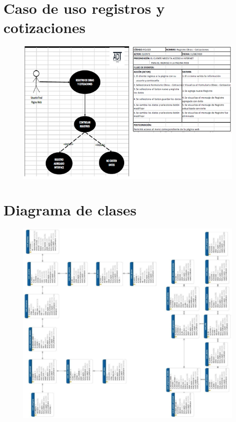 \documentclass[12pt,a4paper]{article}
\begin{document}
\section*{Caso de uso registros y cotizaciones}
\begin{figure}[hbtp]
\caption{}
\centering
\includegraphics[scale=0.6]{DECIMA.png}
\end{figure}


\section*{Diagrama de clases}
\begin{figure}[hbtp]
\caption{}
\centering
\includegraphics[scale=0.6]{UNDECIMA.png}
\end{figure}
\end{document}

